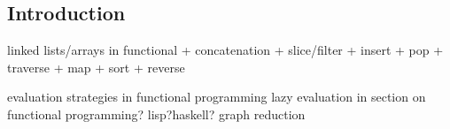 
\subsection{Introduction}

linked lists/arrays in functional
+ concatenation
+ slice/filter
+ insert
+ pop
+ traverse
+ map
+ sort
+ reverse

evaluation strategies in functional programming
lazy evaluation in section on functional programming? lisp?haskell?
graph reduction

